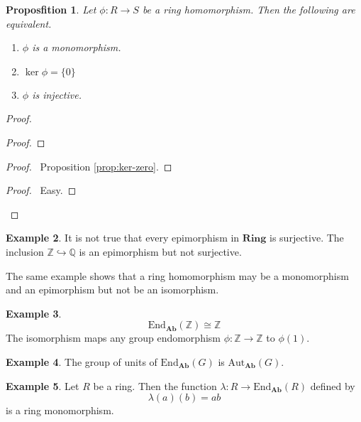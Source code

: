 \documentclass{book}
\let\qed\relax
\newtheorem{prop}{Proposfition}[chapter]
\theoremstyle{definition}
\newtheorem{ex}[prop]{Example}
\newcommand{\Ab}{\ensuremath{\mathbf{Ab}}}
\newcommand{\Aut}[2]{\ensuremath{\mathrm{Aut}_{#1} \left( {#2} \right)}}
\newcommand{\End}[2]{\ensuremath{\mathrm{End}_{#1} \left( {#2} \right)}}
\newcommand{\Ring}{\ensuremath{\mathbf{Ring}}}
\begin{document}
\begin{prop}
Let $\phi : R \rightarrow S$ be a ring homomorphism. Then the following are equivalent.
\begin{enumerate}
\item $\phi$ is a monomorphism.
\item $\ker \phi = \{0\}$
\item $\phi$ is injective.
\end{enumerate}
\end{prop}

\begin{proof}
\pf
{}
\begin{proof}
\end{proof}
\begin{proof}
	\pf\ Proposition \ref{prop:ker-zero}.
\end{proof}
\begin{proof}
	\pf\ Easy.
\end{proof}
\qed
\end{proof}

\begin{ex}
It is not true that every epimorphism in $\Ring$ is surjective. The inclusion $\mathbb{Z} \hookrightarrow \mathbb{Q}$ is an epimorphism but not surjective.

The same example shows that a ring homomorphism may be a monomorphism and an epimorphism but not be an isomorphism.
\end{ex}

\begin{ex}
\[ \End{\Ab}{\mathbb{Z}} \cong \mathbb{Z} \]
The isomorphism maps any group endomorphism $\phi : \mathbb{Z} \rightarrow \mathbb{Z}$ to $\phi(1)$.
\end{ex}

\begin{ex}
The group of units of $\End{\Ab}{G}$ is $\Aut{\Ab}{G}$.
\end{ex}

\begin{ex}
Let $R$ be a ring. Then the function $\lambda : R \rightarrow \End{\Ab}{R}$ defined by
\[ \lambda(a)(b) = ab \]
is a ring monomorphism.
\end{ex}
 
\end{document}

